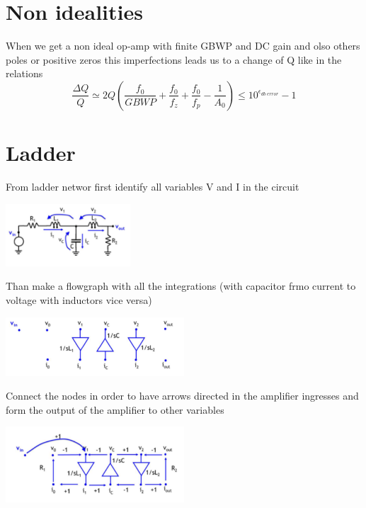 \section{Non idealities}
When we get a non ideal op-amp with finite GBWP and DC gain and olso others poles or positive zeros this imperfections leads us to a change of Q like in the relations 
\begin{equation}
\frac{\Delta Q}{Q}\simeq 2Q\left(\frac{f_0}{GBWP}+\frac{f_0}{f_z}+\frac{f_0}{f_p}-\frac{1}{A_0}\right) \le 10^{\epsilon_{db \ error}}-1
\end{equation}

\section{Ladder}

From ladder networ first identify all variables V and I in the circuit 

\centering
\includegraphics[width=0.35\textwidth]{ldd1.png}\\
\raggedright

Than make a flowgraph with all the integrations (with capacitor frmo current to voltage with inductors vice versa)

\centering
\includegraphics[width=0.5\textwidth]{ldd2.png}\\
\raggedright

Connect the nodes in order to have arrows directed in the amplifier ingresses and form the output of the amplifier to other variables

\centering
\includegraphics[width=0.5\textwidth]{ldd3.png}\\
\raggedright

